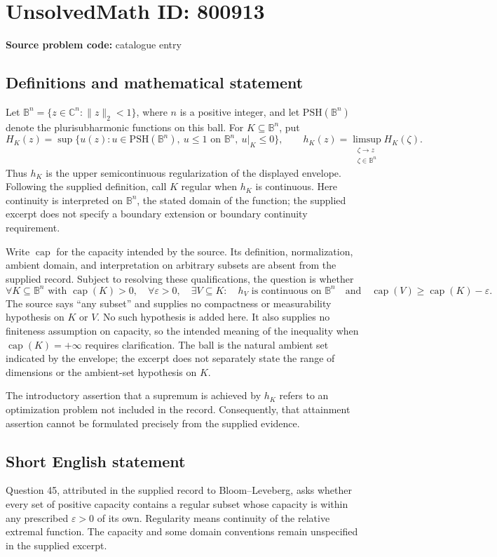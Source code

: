 \documentclass[11pt]{article}
\newcommand{\C}{\mathbb{C}}
\begin{document}
\section*{UnsolvedMath ID: 800913}
\textbf{Source problem code:} catalogue entry
\subsection{Definitions and mathematical statement}
Let \(\mathbb B^n=\{z\in\C^n:\|z\|_2<1\}\), where \(n\) is a positive integer, and let \(\mathrm{PSH}(\mathbb B^n)\) denote the plurisubharmonic functions on this ball. For \(K\subseteq\mathbb B^n\), put
\[
H_K(z)=\sup\{u(z):u\in\mathrm{PSH}(\mathbb B^n),\ u\leq 1\text{ on }\mathbb B^n,\ u|_K\leq 0\},
\qquad
h_K(z)=\limsup_{\substack{\zeta\to z\\\zeta\in\mathbb B^n}}H_K(\zeta).
\]
Thus \(h_K\) is the upper semicontinuous regularization of the displayed envelope. Following the supplied definition, call \(K\) regular when \(h_K\) is continuous. Here continuity is interpreted on \(\mathbb B^n\), the stated domain of the function; the supplied excerpt does not specify a boundary extension or boundary continuity requirement.

Write \(\operatorname{cap}\) for the capacity intended by the source. Its definition, normalization, ambient domain, and interpretation on arbitrary subsets are absent from the supplied record. Subject to resolving these qualifications, the question is whether
\[
\forall K\subseteq\mathbb B^n\text{ with }\operatorname{cap}(K)>0,\quad
\forall\varepsilon>0,\quad
\exists V\subseteq K:\quad
h_V\text{ is continuous on }\mathbb B^n
\quad\text{and}\quad
\operatorname{cap}(V)\geq\operatorname{cap}(K)-\varepsilon.
\]
The source says ``any subset'' and supplies no compactness or measurability hypothesis on \(K\) or \(V\). No such hypothesis is added here. It also supplies no finiteness assumption on capacity, so the intended meaning of the inequality when \(\operatorname{cap}(K)=+\infty\) requires clarification. The ball is the natural ambient set indicated by the envelope; the excerpt does not separately state the range of dimensions or the ambient-set hypothesis on \(K\).

The introductory assertion that a supremum is achieved by \(h_K\) refers to an optimization problem not included in the record. Consequently, that attainment assertion cannot be formulated precisely from the supplied evidence.
\subsection{Short English statement}
Question 45, attributed in the supplied record to Bloom--Leveberg, asks whether every set of positive capacity contains a regular subset whose capacity is within any prescribed \(\varepsilon>0\) of its own. Regularity means continuity of the relative extremal function. The capacity and some domain conventions remain unspecified in the supplied excerpt.
\end{document}
